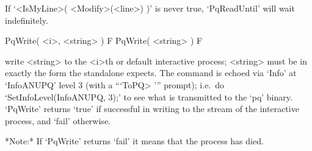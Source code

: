 If `<IsMyLine>( <Modify>(<line>) )' is  never  true,  `PqReadUntil'  will
wait indefinitely.

\>PqWrite( <i>, <string> ) F
\>PqWrite( <string> ) F

write <string> to the <i>th  or  default  interactive  {\ANUPQ}  process;
<string> must be in exactly the form the {\ANUPQ} standalone expects. The
command is echoed via `Info' at `InfoANUPQ' level 3 (with a  ```ToPQ> '''
prompt); i.e.~do `SetInfoLevel(InfoANUPQ, 3);' to see what is transmitted
to the `pq' binary. `PqWrite' returns `true' if successful in writing  to
the stream of the interactive {\ANUPQ} process, and `fail' otherwise.

*Note:*
If `PqWrite' returns `fail' it means that the {\ANUPQ} process has died.

